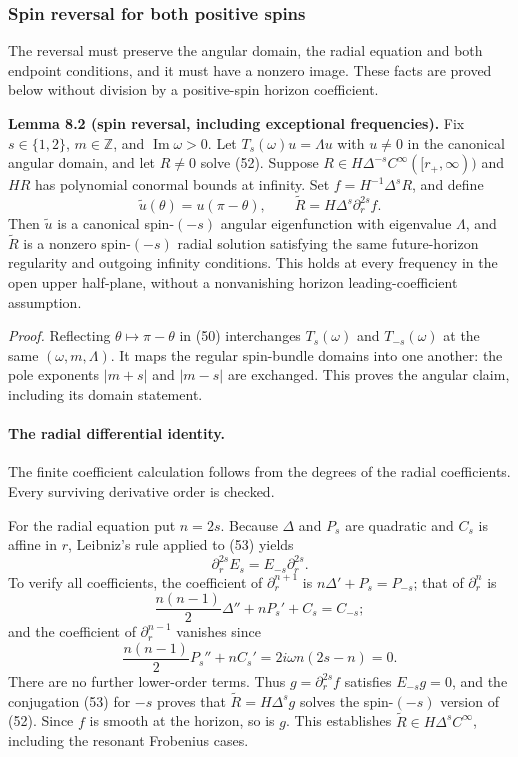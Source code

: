 \documentclass[11pt,a4paper]{article}
\begin{document}
\subsubsection{Spin reversal for both positive spins}\label{readable-kerr-positive}

The reversal must preserve the angular domain, the radial equation and both endpoint conditions, and it must have a nonzero image. These facts are proved below without division by a positive-spin horizon coefficient.

\textbf{Lemma 8.2 (spin reversal, including exceptional frequencies).}
Fix \(s\in\{1,2\}\), \(m\in\mathbb Z\), and
\(\operatorname{Im}\omega>0\). Let \(T_s(\omega)u=\Lambda u\) with
\(u\ne0\) in the canonical angular domain, and let \(R\ne0\) solve (52).
Suppose \(R\in H\Delta^{-s}C^\infty([r_+,\infty))\) and \(HR\) has
polynomial conormal bounds at infinity. Set \(f=H^{-1}\Delta^sR\), and
define \[
 \widetilde u(\theta)=u(\pi-\theta),\qquad
 \widetilde R=H\Delta^s\partial_r^{2s}f.
 \tag{55}
\] Then \(\widetilde u\) is a canonical spin-\((-s)\) angular
eigenfunction with eigenvalue \(\Lambda\), and \(\widetilde R\) is a
nonzero spin-\((-s)\) radial solution satisfying the same future-horizon
regularity and outgoing infinity conditions. This holds at every
frequency in the open upper half-plane, without a nonvanishing horizon
leading-coefficient assumption.

\emph{Proof.} Reflecting \(\theta\mapsto\pi-\theta\) in (50)
interchanges \(T_s(\omega)\) and \(T_{-s}(\omega)\) at the same
\((\omega,m,\Lambda)\). It maps the regular spin-bundle domains into one
another: the pole exponents \(|m+s|\) and \(|m-s|\) are exchanged. This
proves the angular claim, including its domain statement.

\paragraph{The radial differential identity.}\label{readable-kerr-reversal-identity}

The finite coefficient calculation follows from the degrees of the radial coefficients. Every surviving derivative order is checked.

For the radial equation put \(n=2s\). Because \(\Delta\) and \(P_s\) are
quadratic and \(C_s\) is affine in \(r\), Leibniz's rule applied to (53)
yields \[
 \boxed{\quad\partial_r^{2s}E_s
 = E_{-s}\partial_r^{2s}.\quad}
 \tag{56}
\] To verify all coefficients, the coefficient of \(\partial_r^{n+1}\)
is \(n\Delta'+P_s=P_{-s}\); that of \(\partial_r^n\) is \[
 \frac{n(n-1)}2\Delta''+nP_s'+C_s=C_{-s};
\] and the coefficient of \(\partial_r^{n-1}\) vanishes since \[
 \frac{n(n-1)}2P_s''+nC_s'
 =2i\omega n(2s-n)=0.
\] There are no further lower-order terms. Thus \(g=\partial_r^{2s}f\)
satisfies \(E_{-s}g=0\), and the conjugation (53) for \(-s\) proves that
\(\widetilde R=H\Delta^sg\) solves the spin-\((-s)\) version of (52).
Since \(f\) is smooth at the horizon, so is \(g\). This establishes
\(\widetilde R\in H\Delta^sC^\infty\), including the resonant Frobenius
cases.
\end{document}
